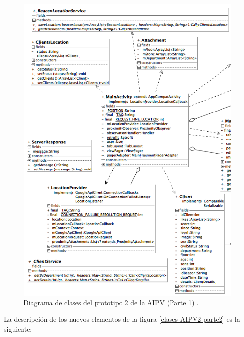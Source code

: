 \FloatBarrier
\begin{figure}[htbp!]
		\centering
			\includegraphics[width=.9 \textwidth]{imagenes/adrian/vendedor/prototipo2/clases_1}
		\caption{Diagrama de clases del prototipo 2 de la AIPV (Parte 1) .}
		\label{clases-AIPV2-parte1}
\end{figure}
\FloatBarrier

La descripción de los nuevos elementos de la figura \ref{clases-AIPV2-parte2} es la siguiente: 

